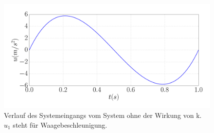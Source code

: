 \begin{beispiel}[Doppelintegrator]
	
	
	\begin{figure}
		\centering
		\includegraphics[width=12cm]{bild/30_32/test0_ohne_k_ori_u.pdf}
		\caption{Verlauf des Systemeingangs vom System ohne der Wirkung von k. $u_{1}$ steht für Waagebeschleunigung.}
		\label{fig:Doppelintegrator_ohne_k_u}
	\end{figure}
	

\end{beispiel}
